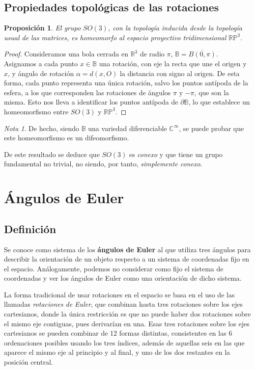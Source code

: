 \documentclass{article}
\theoremstyle{plain}
\newtheorem{proposition}{Proposición}
\theoremstyle{definition}
\theoremstyle{remark}
\newtheorem*{remark}{Nota}
\begin{document}
\subsection{Propiedades topológicas de las rotaciones}
\begin{proposition}
  El grupo $SO(3)$, con la topología inducida desde la topología usual
  de las matrices, es homeomorfo al espacio proyectivo tridimensional
  $\mathbb{RP}^3$.
\end{proposition}
\begin{proof}
  Consideramos una bola cerrada en $\mathbb R^3$ de radio $\pi$,
  $\mathbb B = \overline{B(0, \pi)}$. Asignamos a cada punto $x \in \mathbb B$
  una rotación, con eje la recta que une el origen y $x$, y ángulo de
  rotación $\alpha = d(x, O)$ la distancia con signo al origen. De
  esta forma, cada punto representa una única rotación, salvo los
  puntos antípoda de la esfera, a los que corresponden las rotaciones de ángulos
  $\pi$ y $-\pi$, que son la misma. Esto nos lleva a identificar los
  puntos antípoda de $\partial \mathbb B$, lo que establece un
  homeomorfismo entre $SO(3)$ y $\mathbb{RP}^3$.
\end{proof}

\begin{remark}
  De hecho, siendo $\mathbb B$ una variedad diferenciable
  $\mathbb{C^{\infty}}$, se puede probar que este homeomorfismo es un
  difeomorfismo.
\end{remark}

De este resultado se deduce que $SO(3)$ es \textit{conexo} y que tiene un grupo
fundamental no trivial, no siendo, por tanto, \textit{simplemente conexo}.


\section{Ángulos de Euler}
\subsection{Definición}

Se conoce como sistema de los \textbf{ángulos de Euler} al que utiliza
tres ángulos para describir la orientación de un objeto respecto a un
sistema de coordenadas fijo en el espacio. Análogamente, podemos no
considerar como fijo el sistema de coordenadas y ver los ángulos de
Euler como una orientación de dicho sistema. %

La forma tradicional de usar rotaciones en el espacio se basa en el
uso de las llamadas \textit{rotaciones de Euler}, que combinan hasta tres
rotaciones sobre los ejes cartesianos, donde la única restricción es
que no puede haber dos rotaciones sobre el mismo eje contiguas, pues
derivarían en una. Esas tres rotaciones sobre los ejes cartesianos se
pueden combinar de 12 formas distintas, consistentes en las 6
ordenaciones posibles usando los tres índices, además de aquellas seis
en las que aparece el mismo eje al principio y al final, y uno de los
dos restantes en la posición central. %
\end{document}
